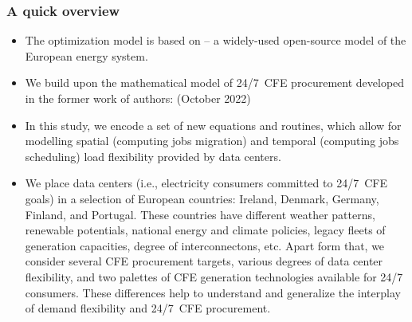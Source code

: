 \begin{frame}
  \frametitle{A quick overview}

{\footnotesize
  \begin{itemize}
    
    \item The optimization model is based on  -- a widely-used open-source model of the European energy system.

    \item We build upon the mathematical model of 24/7~CFE procurement developed in the former work of authors:  (October 2022)
    
    \item In this study, we encode a set of new equations and routines, which allow for modelling spatial (computing jobs migration) and temporal (computing jobs scheduling) load flexibility provided by data centers.

    \item We place data centers (i.e., electricity consumers committed to 24/7~CFE goals) in a 
    selection of European countries: Ireland, Denmark, Germany, Finland, and Portugal. These countries have different weather patterns, renewable potentials, national energy and climate policies, legacy fleets of generation capacities, degree of interconnectons, etc. 
    Apart form that, we consider several CFE procurement targets, various degrees of data center flexibility, and two palettes of CFE generation technologies available for 24/7 consumers. These differences help to understand and generalize the interplay of demand flexibility and 24/7~CFE procurement.

  \end{itemize}
}

\end{frame}


